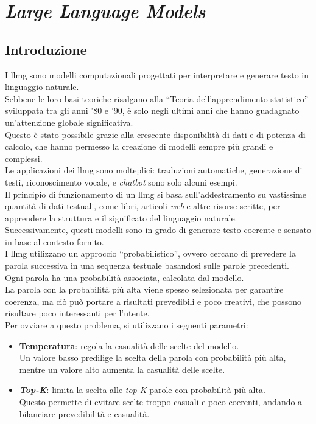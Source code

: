 \pagebreak
\section{\textit{Large Language Models}}
\label{sez:llm}

\subsection{Introduzione}
\label{subsec:llm-introduzione}

I \gls{llmg} sono modelli computazionali progettati per interpretare e generare testo in linguaggio naturale.\\
Sebbene le loro basi teoriche risalgano alla ``Teoria dell'apprendimento statistico'' sviluppata tra gli anni '80 e '90, è solo negli ultimi anni che hanno guadagnato un'attenzione globale significativa. \\
Questo è stato possibile grazie alla crescente disponibilità di dati e di potenza di calcolo, che hanno permesso la creazione di modelli sempre più grandi e complessi.\\
Le applicazioni dei \gls{llmg} sono molteplici: traduzioni automatiche, generazione di testi, riconoscimento vocale, e \textit{chatbot} sono solo alcuni esempi.\\

\noindent Il principio di funzionamento di un \gls{llmg} si basa sull'addestramento su vastissime quantità di dati testuali, come libri, articoli \textit{web} e altre risorse scritte, 
per apprendere la struttura e il significato del linguaggio naturale.\\
Successivamente, questi modelli sono in grado di generare testo coerente e sensato in base al contesto fornito.\\

\noindent I \gls{llmg} utilizzano un approccio ``probabilistico'', ovvero cercano di prevedere la parola successiva in una sequenza testuale basandosi sulle parole precedenti.\\
Ogni parola ha una probabilità associata, calcolata dal modello. \\
La parola con la probabilità più alta viene spesso selezionata per garantire coerenza, ma ciò può portare a risultati prevedibili e poco creativi, che possono risultare poco interessanti per l'utente.\\

\noindent Per ovviare a questo problema, si utilizzano i seguenti parametri:
\begin{itemize}
    \item \textbf{Temperatura}: regola la casualità delle scelte del modello. \\
    Un valore basso predilige la scelta della parola con probabilità più alta, mentre un valore alto aumenta la casualità delle scelte.
    \item \textbf{\textit{Top-K}}: limita la scelta alle \textit{top-K} parole con probabilità più alta.\\
    Questo permette di evitare scelte troppo casuali e poco coerenti, andando a bilanciare prevedibilità e casualità.\\
\end{itemize}

